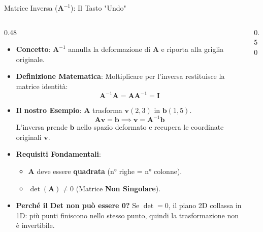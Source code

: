 \documentclass[aspectratio=169, 10pt]{beamer}
\begin{document}
\begin{frame}{Matrice Inversa ($\mathbf{A}^{-1}$): Il Tasto "Undo"}
    \begin{columns}[T,onlytextwidth]
        \setlength{\columnsep}{0.25cm}
        
        \begin{column}{0.48\textwidth}
            \scriptsize
            \begin{itemize}
                \setlength\itemsep{0.2em}
                \item \textbf{Concetto}: $\mathbf{A}^{-1}$ annulla la deformazione di $\mathbf{A}$ e riporta alla griglia originale.
                
                \item \textbf{Definizione Matematica}:
                Moltiplicare per l'inversa restituisce la matrice identità:
                \[ \mathbf{A}^{-1}\mathbf{A} = \mathbf{A}\mathbf{A}^{-1} = \mathbf{I} \]
                
                \item \textbf{Il nostro Esempio}:
                $\mathbf{A}$ trasforma $\mathbf{v}(2,3)$ in $\mathbf{b}(1,5)$.
                \[ \mathbf{A}\mathbf{v} = \mathbf{b} \implies \mathbf{v} = \mathbf{A}^{-1}\mathbf{b} \]
                L'inversa prende $\mathbf{b}$ nello spazio deformato e recupera le coordinate originali $\mathbf{v}$.
                
                \item \textbf{Requisiti Fondamentali}:
                \begin{itemize}
                    \setlength\itemsep{0.1em}
                    \item $\mathbf{A}$ deve essere \textbf{quadrata} (n° righe = n° colonne).
                    \item $\det(\mathbf{A}) \neq 0$ (Matrice \textbf{Non Singolare}).
                \end{itemize}
                
                \item \textbf{Perché il Det non può essere 0?}
                Se $\det=0$, il piano 2D collassa in 1D: più punti finiscono nello stesso punto, quindi la trasformazione non è invertibile.
            \end{itemize}
        \end{column}
        
        \begin{column}{0.50\textwidth}
            \centering
            \scriptsize
            \vspace{0.04cm}
            

\end{column}
\end{columns}
\end{frame}
\end{document}
